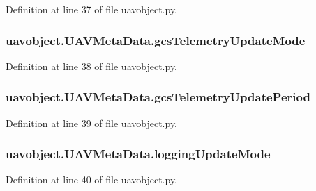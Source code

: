 Definition at line 37 of file uavobject.\-py.

\hypertarget{classuavobject_1_1_u_a_v_meta_data_a11b180f745b8a0e744123807d67da310}{
\subsubsection[{gcs\-Telemetry\-Update\-Mode}]{\setlength{\rightskip}{0pt plus 5cm}uavobject.\-U\-A\-V\-Meta\-Data.\-gcs\-Telemetry\-Update\-Mode}}\label{classuavobject_1_1_u_a_v_meta_data_a11b180f745b8a0e744123807d67da310}


Definition at line 38 of file uavobject.\-py.

\hypertarget{classuavobject_1_1_u_a_v_meta_data_a52d403f306cc0d46c9e8e48d8071aaca}{
\subsubsection[{gcs\-Telemetry\-Update\-Period}]{\setlength{\rightskip}{0pt plus 5cm}uavobject.\-U\-A\-V\-Meta\-Data.\-gcs\-Telemetry\-Update\-Period}}\label{classuavobject_1_1_u_a_v_meta_data_a52d403f306cc0d46c9e8e48d8071aaca}


Definition at line 39 of file uavobject.\-py.

\hypertarget{classuavobject_1_1_u_a_v_meta_data_a5a8be2e2c52ca37e0fc0d60114f69412}{
\subsubsection[{logging\-Update\-Mode}]{\setlength{\rightskip}{0pt plus 5cm}uavobject.\-U\-A\-V\-Meta\-Data.\-logging\-Update\-Mode}}\label{classuavobject_1_1_u_a_v_meta_data_a5a8be2e2c52ca37e0fc0d60114f69412}


Definition at line 40 of file uavobject.\-py.

